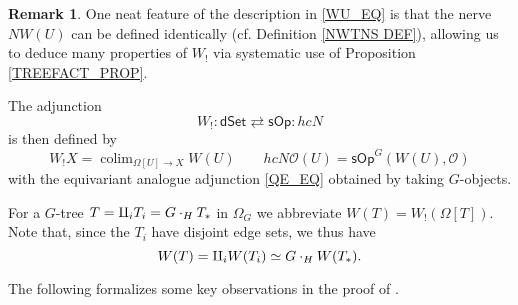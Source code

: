 \documentclass[a4paper,10pt]{article}%
\numberwithin{equation}{section}
\numberwithin{figure}{section}
\theoremstyle{definition} %
\newtheorem{remark}[equation]{Remark}%
\newcommand{\sOp}{\ensuremath{\mathsf{sOp}}}%
\newcommand{\dSet}{\mathsf{dSet}}
\DeclareMathOperator{\colim}{colim}%
\renewcommand{\O}{\ensuremath{\mathcal O}}
\newcommand{\1}{\ensuremath{\mathbbm 1}}%
\begin{document}
\begin{remark}
	One neat feature of the description in 
	\eqref{WU_EQ}
	is that the nerve $N W(U)$
	can be defined identically 
	(cf. Definition \ref{NWTNS DEF}),
	allowing us to deduce many properties of $W_!$
	via systematic use of 
	Proposition \ref{TREEFACT_PROP}.
\end{remark}



The adjunction
\begin{equation} \label{SOPDSET_EQ}
	W_! \colon \dSet \rightleftarrows \sOp \colon h c N           
\end{equation}
is then defined by
\[
	W_!X = \colim_{\Omega[U] \to X}W(U)
	\qquad
	hcN\O(U) = \sOp^G(W(U), \O)
\]
with the equivariant analogue adjunction \eqref{QE_EQ}
obtained by taking $G$-objects.


For a $G$-tree 
$T = \amalg_i T_i = G \cdot_H T_{\**}$
in $\Omega_G$
we abbreviate
$W(T) = W_!(\Omega[T])$.
Note that, since the $T_i$ have disjoint edge sets, we thus have
\[
	W(T) = \amalg_i W(T_i) \simeq G \cdot_H W(T_{\**}).
\]


The following formalizes some key observations in the proof of
\cite[Prop. 4.5]{CM13b}.
\end{document}
